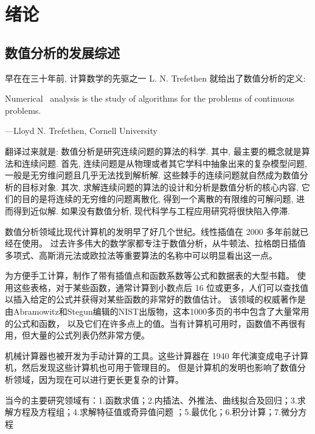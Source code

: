 \documentclass[UTF8]{ctexart}
\begin{document}
\begin{center}
  \renewcommand{\contentsname}{目录} %
\end{center}
\begin{center}
  \tableofcontents
\end{center}
\setcounter{page}{0}
\thispagestyle{empty} 
\newpage

\section{绪论}
\subsection{数值分析的发展综述}
早在在三十年前, 计算数学的先驱之一 L. N. Trefethen 就给出了数值分析的定义:

Numerical~ analysis is the study of algorithms for the problems of continuous problems.

---Lloyd N. Trefethen, Cornell University

翻译过来就是: 数值分析是研究连续问题的算法的科学. 其中, 最主要的概念就是算法和连续问题. 首先, 连续问题是从物理或者其它学科中抽象出来的复杂模型问题, 一般是无穷维问题且几乎无法找到解析解. 这些棘手的连续问题就自然成为数值分析的目标对象. 其次, 求解连续问题的算法的设计和分析是数值分析的核心内容, 它们的目的是将连续的无穷维的问题离散化, 得到一个离散的有限维的可解问题, 进而得到近似解. 如果没有数值分析, 现代科学与工程应用研究将很快陷入停滞.

数值分析领域比现代计算机的发明早了好几个世纪。线性插值在 2000 多年前就已经在使用。
过去许多伟大的数学家都专注于数值分析，从牛顿法、拉格朗日插值多项式、高斯消元法或欧拉法等重要算法的名称中可以明显看出这一点。

为方便手工计算，制作了带有插值点和函数系数等公式和数据表的大型书籍。
使用这些表格，对于某些函数，通常计算到小数点后 16 位或更多，人们可以查找值以插入给定的公式并获得对某些函数的非常好的数值估计。
该领域的权威著作是由Abramowitz和Stegun编辑的NIST出版物，这本1000多页的书中包含了大量常用的公式和函数，
以及它们在许多点上的值。当有计算机可用时，函数值不再很有用，但大量的公式列表仍然非常方便。

机械计算器也被开发为手动计算的工具。这些计算器在 1940 年代演变成电子计算机，然后发现这些计算机也可用于管理目的。
但是计算机的发明也影响了数值分析领域，因为现在可以进行更长更复杂的计算。

当今的主要研究领域有：1.函数求值；2.内插法、外推法、曲线拟合及回归；3.求解方程及方程组；4.求解特征值或奇异值问题
；5.最优化；6.积分计算；7.微分方程
\end{document}
